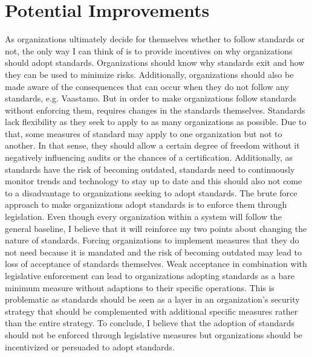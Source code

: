 \documentclass[12pt]{article}
\begin{document}
\section{Potential Improvements}
As organizations ultimately decide for themselves whether to follow standards or not, the only way I can think of is to provide incentives on why organizations should adopt standards.
\newline
Organizations should know why standards exit and how they can be used to minimize risks. Additionally, organizations should also be made aware of the consequences that can occur when they do not follow any standards, e.g. Vaastamo.
\newline
But in order to make organizations follow standards without enforcing them, requires changes in the standards themselves. Standards lack flexibility as they seek to apply to as many organizations as possible. Due to that, some measures of standard may apply to one organization but not to another. In that sense, they should allow a certain degree of freedom without it negatively influencing audits or the chances of a certification.
\newline
Additionally, as standards have the risk of becoming outdated, standards need to continuously monitor trends and technology to stay up to date and this should also not come to a disadvantage to organizations seeking to adopt standards.
\newline
The brute force approach to make organizations adopt standards is to enforce them through legislation. Even though every organization within a system will follow the general baseline, I believe that it will reinforce my two points about changing the nature of standards. Forcing organizations to implement measures that they do not need because it is mandated and the risk of becoming outdated may lead to loss of acceptance of standards themselves.
\newline
Weak acceptance in combination with legislative enforcement can lead to organizations adopting standards as a bare minimum measure without adaptions to their specific operations.
This is problematic as standards should be seen as a layer in an organization's security strategy that should be complemented with additional specific measures rather than the entire strategy.
\newline
To conclude, I believe that the adoption of standards should not be enforced through legislative measures but organizations should be incentivized or persuaded to adopt standards.
\end{document}
